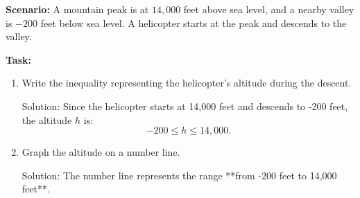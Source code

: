 \documentclass[12pt]{article}
\begin{document}
\begin{tcolorbox}[colframe=black!60, colback=white, 
coltitle=black, colbacktitle=black!15, fonttitle=\bfseries\Large, 
title=Performance Task: Mountain Heights and Depths (Part 1), halign title=center, left=10pt, right=10pt, top=10pt, bottom=60pt]
\textbf{Scenario:} A mountain peak is at \( 14,000 \) feet above sea level, and a nearby valley is \( -200 \) feet below sea level. A helicopter starts at the peak and descends to the valley.

\textbf{Task:}
\begin{enumerate}[itemsep=5em]

    \item Write the inequality representing the helicopter's altitude during the descent.
    
        {\color{red} Solution: Since the helicopter starts at 14,000 feet and descends to -200 feet, the altitude \( h \) is:
        \[
        -200 \leq h \leq 14,000.
        \]}

    \item Graph the altitude on a number line.

    \begin{center}
    \end{center}

    {\color{red} Solution: The number line represents the range **from -200 feet to 14,000 feet**.}
    
\end{enumerate}
\end{tcolorbox}

\vspace{1em}
\end{document}

